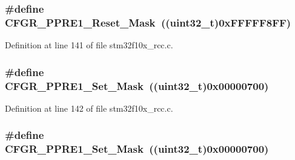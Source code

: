 \subsubsection[{\texorpdfstring{C\+F\+G\+R\+\_\+\+P\+P\+R\+E1\+\_\+\+Reset\+\_\+\+Mask}{CFGR_PPRE1_Reset_Mask}}]{\setlength{\rightskip}{0pt plus 5cm}\#define C\+F\+G\+R\+\_\+\+P\+P\+R\+E1\+\_\+\+Reset\+\_\+\+Mask~(({\bf uint32\+\_\+t})0x\+F\+F\+F\+F\+F8\+F\+F)}\hypertarget{group___r_c_c___private___defines_gab02d8032f451eb5a1d139007ff57f22e}{}\label{group___r_c_c___private___defines_gab02d8032f451eb5a1d139007ff57f22e}


Definition at line 141 of file stm32f10x\+\_\+rcc.\+c.

\subsubsection[{\texorpdfstring{C\+F\+G\+R\+\_\+\+P\+P\+R\+E1\+\_\+\+Set\+\_\+\+Mask}{CFGR_PPRE1_Set_Mask}}]{\setlength{\rightskip}{0pt plus 5cm}\#define C\+F\+G\+R\+\_\+\+P\+P\+R\+E1\+\_\+\+Set\+\_\+\+Mask~(({\bf uint32\+\_\+t})0x00000700)}\hypertarget{group___r_c_c___private___defines_ga74838e1873c5e4c46eef61a81b1bd2c5}{}\label{group___r_c_c___private___defines_ga74838e1873c5e4c46eef61a81b1bd2c5}


Definition at line 142 of file stm32f10x\+\_\+rcc.\+c.

\subsubsection[{\texorpdfstring{C\+F\+G\+R\+\_\+\+P\+P\+R\+E1\+\_\+\+Set\+\_\+\+Mask}{CFGR_PPRE1_Set_Mask}}]{\setlength{\rightskip}{0pt plus 5cm}\#define C\+F\+G\+R\+\_\+\+P\+P\+R\+E1\+\_\+\+Set\+\_\+\+Mask~(({\bf uint32\+\_\+t})0x00000700)}\hypertarget{group___r_c_c___private___defines_ga74838e1873c5e4c46eef61a81b1bd2c5}{}\label{group___r_c_c___private___defines_ga74838e1873c5e4c46eef61a81b1bd2c5}


